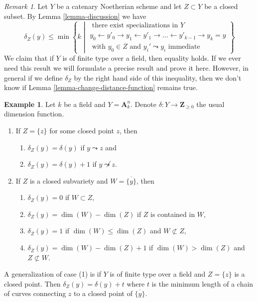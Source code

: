 \documentclass{stacks-project}
\theoremstyle{plain}
\theoremstyle{definition}
\newtheorem{example}[subsection]{Example}
\theoremstyle{remark}
\newtheorem{remark}[subsection]{Remark}
\numberwithin{equation}{subsection}
\begin{document}
\begin{remark}
\label{remark-discussion}
Let $Y$ be a catenary Noetherian scheme and let $Z \subset Y$
be a closed subset. By Lemma \ref{lemma-discussion} we have
$$
\delta_Z(y) \leq \min
\left\{ k \middle|
\begin{matrix}
\text{ there exist specializations in }Y \\
y_0 \leftarrow y'_0 \rightarrow y_1 \leftarrow y'_1 \rightarrow \ldots
\leftarrow y'_{k - 1} \rightarrow y_k = y \\
\text{ with }y_0 \in Z\text{ and }y_i' \leadsto y_i
\text{ immediate}
\end{matrix}
\right\}
$$
We claim that if $Y$ is of finite type over a field,
then equality holds. If we ever need this result we
will formulate a precise result and prove it here.
However, in general if we define $\delta_Z$
by the right hand side of this inequality, then we don't
know if Lemma \ref{lemma-change-distance-function} remains true.
\end{remark}

\begin{example}
\label{example-distance}
Let $k$ be a field and $Y = \mathbf{A}^n_k$. Denote
$\delta : Y \to \mathbf{Z}_{\geq 0}$ the usual dimension function.
\begin{enumerate}
\item If $Z = \{z\}$ for some closed point $z$, then
\begin{enumerate}
\item $\delta_Z(y) = \delta(y)$ if $y \leadsto z$ and
\item $\delta_Z(y) = \delta(y) + 1$ if $y \not \leadsto z$.
\end{enumerate}
\item If $Z$ is a closed subvariety and $W = \overline{\{y\}}$, then
\begin{enumerate}
\item $\delta_Z(y) = 0$ if $W \subset Z$,
\item $\delta_Z(y) = \dim(W) - \dim(Z)$ if $Z$ is contained in $W$,
\item $\delta_Z(y) = 1$ if $\dim(W) \leq \dim(Z)$ and $W \not \subset Z$,
\item $\delta_Z(y) = \dim(W) - \dim(Z) + 1$ if $\dim(W) > \dim(Z)$
and $Z \not \subset W$.
\end{enumerate}
\end{enumerate}
A generalization of case (1) is if $Y$ is of finite type over a field
and $Z = \{z\}$ is a closed point. Then $\delta_Z(y) = \delta(y) + t$
where $t$ is the minimum length of a chain of curves connecting
$z$ to a closed point of $\overline{\{y\}}$.
\end{example}
\end{document}
